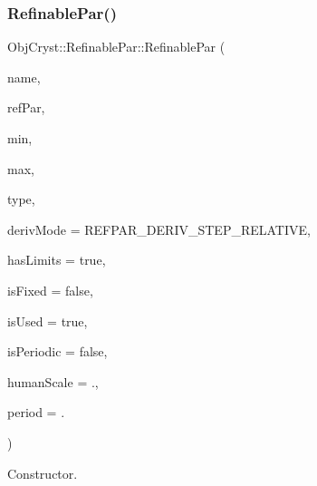 \subsubsection{\texorpdfstring{RefinablePar()}{RefinablePar()}\hspace{0.1cm}{\footnotesize\ttfamily [2/3]}}
{\footnotesize\ttfamily Obj\+Cryst\+::\+Refinable\+Par\+::\+Refinable\+Par (\begin{DoxyParamCaption}\item[{const string \&}]{name,  }\item[{R\+E\+AL $\ast$}]{ref\+Par,  }\item[{const R\+E\+AL}]{min,  }\item[{const R\+E\+AL}]{max,  }\item[{const \mbox{\hyperlink{class_obj_cryst_1_1_ref_par_type}{Ref\+Par\+Type}} $\ast$}]{type,  }\item[{Ref\+Par\+Deriv\+Step\+Model}]{deriv\+Mode = {\ttfamily REFPAR\+\_\+DERIV\+\_\+STEP\+\_\+RELATIVE},  }\item[{const bool}]{has\+Limits = {\ttfamily true},  }\item[{const bool}]{is\+Fixed = {\ttfamily false},  }\item[{const bool}]{is\+Used = {\ttfamily true},  }\item[{const bool}]{is\+Periodic = {\ttfamily false},  }\item[{const R\+E\+AL}]{human\+Scale = {.},  }\item[{R\+E\+AL}]{period = {.} }\end{DoxyParamCaption})}



Constructor. 

